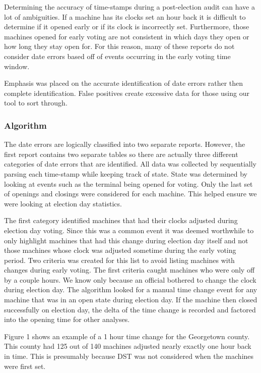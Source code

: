 Determining the accuracy of time-stamps during a post-election audit can have a lot of ambiguities. If a machine has its clocks set an hour back it is difficult to determine if it opened early or if its clock is incorrectly set. Furthermore, those machines opened for early voting are not consistent in which days they open or how long they stay open for. For this reason, many of these reports do not consider date errors based off of events occurring in the early voting time window.

Emphasis was placed on the accurate identification of date errors rather then complete identification. False positives create excessive data for those using our tool to sort through.

\subsubsection{Algorithm}
The date errors are logically classified into two separate reports. However, the first report contains two separate tables so there are actually three different categories of date errors that are identified.  All data was collected by sequentially parsing each time-stamp while keeping track of state. State was determined by looking at events such as the terminal being opened for voting. Only the last set of openings and closings were considered for each machine. This helped ensure we were looking at election day statistics.

The first category identified machines that had their clocks adjusted during election day voting. Since this was a common event it was deemed worthwhile to only highlight machines that had this change during election day itself and not those machines whose clock was adjusted sometime during the early voting period.  Two criteria was created for this list to avoid listing machines with changes during early voting.  The first criteria caught machines who were only off by a couple hours.  We know only because an official bothered to change the clock during election day. The algorithm looked for a manual time change event for any machine that was in an open state during election day.  If the machine then closed successfully on election day, the delta of the time change is recorded and factored into the opening time for other analyses.  

Figure 1 shows an example of a 1 hour time change for the Georgetown county.  This county had 125 out of 140 machines adjusted nearly exactly one hour back in time.  This is presumably because DST was not considered when the machines were first set.

